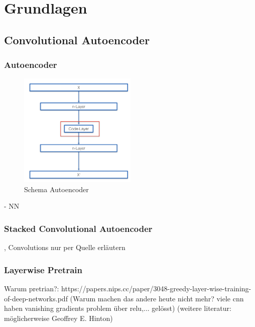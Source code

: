 \chapter{Grundlagen}
\label{chap:Grundlagen}



	\section{ Convolutional Autoencoder}
	\label{sec:StackedConvolutionalAutoencoder}
		\subsection{Autoencoder }			
			\begin{figure}[h]
				\centering
				\includegraphics[width=0.5\textwidth, center]{bilder/Schema_Autoencoders/Schema_CAE.png}
				\caption[Schema Autoencoder]{Schema Autoencoder}
				\label{img:SchemaCAE}
			\end{figure}  
		
			- NN
		\subsection{Stacked Convolutional Autoencoder }
			, Convolutions nur per Quelle erläutern
		\subsection{Layerwise Pretrain }

		Warum pretrian?:	https://papers.nips.cc/paper/3048-greedy-layer-wise-training-of-deep-networks.pdf (Warum machen das andere heute nicht mehr? viele cnn haben vanishing gradients problem  über relu,... gelösst) (weitere literatur: möglicherweise Geoffrey E. Hinton)

